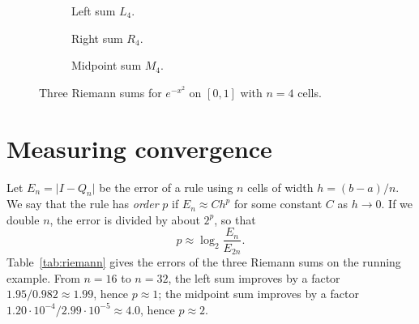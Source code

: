 \documentclass[11pt,a4paper,twoside,openright]{book}
\newcommand{\abs}[1]{\lvert #1\rvert}
\newcommand{\riemannboxes}[3]{%
  \pgfmathtruncatemacro{\nm}{#1-1}%
  \foreach \i in {0,...,\nm}{%
    \pgfmathsetmacro{\xa}{\i/#1}\pgfmathsetmacro{\xb}{(\i+1)/#1}\pgfmathsetmacro{\xc}{(\i+#2)/#1}%
    \pgfmathsetmacro{\yc}{exp(-\xc*\xc)}%
    \addplot[#3] coordinates {(\xa,0) (\xa,\yc) (\xb,\yc) (\xb,0)} \closedcycle;%
  }}
\begin{document}
\begin{figure}[htbp]
  \centering
  \begin{subfigure}[t]{0.32\textwidth}
    \centering
    \caption{Left sum $L_4$.}
  \end{subfigure}\hfill
  \begin{subfigure}[t]{0.32\textwidth}
    \centering
    \caption{Right sum $R_4$.}
  \end{subfigure}\hfill
  \begin{subfigure}[t]{0.32\textwidth}
    \centering
    \caption{Midpoint sum $M_4$.}
  \end{subfigure}
  \caption{Three Riemann sums for $e^{-x^{2}}$ on $[0,1]$ with $n=4$ cells.}
  \label{fig:riemann}
\end{figure}

\section{Measuring convergence}
Let $E_n=\abs{I-Q_n}$ be the error of a rule using $n$ cells of width $h=(b-a)/n$.
We say that the rule has \emph{order} $p$ if $E_n\approx C h^{p}$ for some constant $C$ as $h\to0$.
If we double $n$, the error is divided by about $2^{p}$, so that
\begin{equation}
  p\approx\log_2\frac{E_n}{E_{2n}} .
  \label{eq:order}
\end{equation}
Table~\ref{tab:riemann} gives the errors of the three Riemann sums on the running example.
From $n=16$ to $n=32$, the left sum improves by a factor $1.95/0.982\approx1.99$, hence $p\approx1$; the midpoint sum improves by a factor $1.20\cdot10^{-4}/2.99\cdot10^{-5}\approx 4.0$, hence $p\approx2$.
\end{document}
